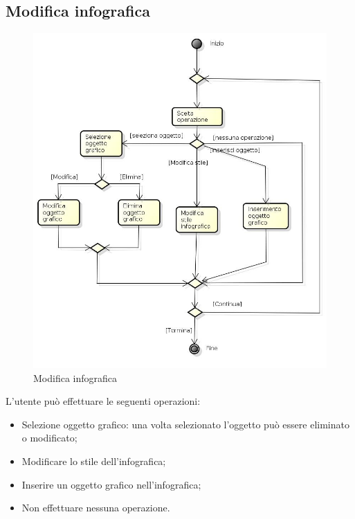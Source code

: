\newpage

\subsection{Modifica infografica}

\begin{figure}[h!]
		\centering
		\includegraphics[scale=.5]{img/attivita/Modifica_infografica.jpg}
		\caption{Modifica infografica}
		\label{fig:Modifica_infografica}
\end{figure}

L'utente può effettuare le seguenti operazioni:
\begin{itemize}
\item Selezione oggetto grafico: una volta selezionato l'oggetto può essere eliminato o modificato;
\item Modificare lo stile dell'infografica;
\item Inserire un oggetto grafico nell'infografica;
\item Non effettuare nessuna operazione.
\end{itemize}

\newpage

